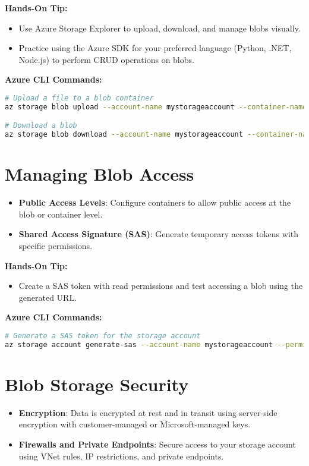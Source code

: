 \documentclass{article}
\begin{document}
\textbf{Hands-On Tip:}
\begin{itemize}
    \item Use Azure Storage Explorer to upload, download, and manage blobs visually.
    \item Practice using the Azure SDK for your preferred language (Python, .NET, Node.js) to perform CRUD operations on blobs.
\end{itemize}

\textbf{Azure CLI Commands:}
\begin{lstlisting}[language=bash]
# Upload a file to a blob container
az storage blob upload --account-name mystorageaccount --container-name mycontainer --name myfile.txt --file /path/to/local/file.txt

# Download a blob
az storage blob download --account-name mystorageaccount --container-name mycontainer --name myfile.txt --file /path/to/download/file.txt
\end{lstlisting}

\section{Managing Blob Access}
\begin{itemize}
    \item \textbf{Public Access Levels}: Configure containers to allow public access at the blob or container level.
    \item \textbf{Shared Access Signature (SAS)}: Generate temporary access tokens with specific permissions.
\end{itemize}

\textbf{Hands-On Tip:}
\begin{itemize}
    \item Create a SAS token with read permissions and test accessing a blob using the generated URL.
\end{itemize}

\textbf{Azure CLI Commands:}
\begin{lstlisting}[language=bash]
# Generate a SAS token for the storage account
az storage account generate-sas --account-name mystorageaccount --permissions r --resource-types o --services b --expiry 2024-12-31T23:59:59Z
\end{lstlisting}

\section{Blob Storage Security}
\begin{itemize}
    \item \textbf{Encryption}: Data is encrypted at rest and in transit using server-side encryption with customer-managed or Microsoft-managed keys.
    \item \textbf{Firewalls and Private Endpoints}: Secure access to your storage account using VNet rules, IP restrictions, and private endpoints.
\end{itemize}
\end{document}
